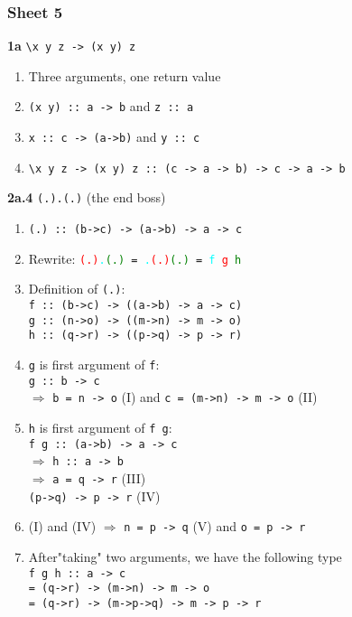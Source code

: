 \documentclass[12pt]{article}
\begin{document}
\subsubsection{Sheet 5}
\textbf{1a} \verb|\x y z -> (x y) z|
\begin{enumerate}
    \item Three arguments, one return value
    \item \verb|(x y) :: a -> b| and \verb|z :: a|
    \item \verb|x :: c -> (a->b)| and \verb|y :: c|
    \item \verb|\x y z -> (x y) z :: (c -> a -> b) -> c -> a -> b|
\end{enumerate}
\textbf{2a.4} \texttt{(.).(.)} (the end boss)
\begin{enumerate}
    \item \texttt{(.) :: (b->c) -> (a->b) -> a -> c}
    \item Rewrite: \texttt{\textcolor{Red}{(.)}\textcolor{Cyan}{.}\textcolor{Green}{(.)} 
    = \textcolor{Cyan}{.}\textcolor{Red}{(.)}\textcolor{Green}{(.)} 
    = \textcolor{Cyan}{f} \textcolor{Red}{g} \textcolor{Green}{h}}
    \item Definition of \texttt{(.)}: \\
    \texttt{f :: (b->c) -> ((a->b) -> a -> c)} \\
    \texttt{g :: (n->o) -> ((m->n) -> m -> o)} \\
    \texttt{h :: (q->r) -> ((p->q) -> p -> r)} 
    \item \texttt{g} is first argument of \texttt{f}: \\
    \texttt{g :: b -> c} \\
    $\Rightarrow$ \texttt{b = n -> o} (I) and
    \texttt{c = (m->n) -> m -> o} (II)
    \item \texttt{h} is first argument of \texttt{f g}:\\
    \texttt{f g :: (a->b) -> a -> c}   \\
    $\Rightarrow$ \texttt{h :: a -> b}  \\
    $\Rightarrow$ \texttt{a = q -> r} (III)\\
    \texttt{(p->q) -> p -> r} (IV)
    \item (I) and (IV) $\Rightarrow$ 
    \texttt{n = p -> q} (V) and \texttt{o = p -> r}
    \item After"taking" two arguments, we have the following type \\
    \texttt{f g h :: a -> c} \\
    \texttt{= (q->r) -> (m->n) -> m -> o} \\
    \texttt{= (q->r) -> (m->p->q) -> m -> p -> r }
\end{enumerate}
\end{document}
